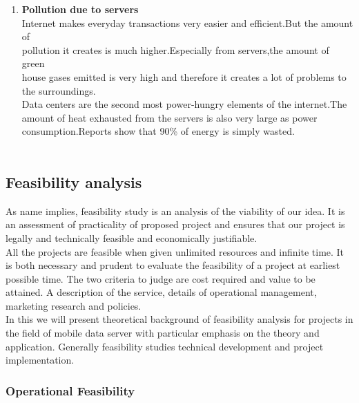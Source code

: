 \documentclass[12pt, a4paper]{article}
\begin{document}
\begin{enumerate}[leftmargin=1.2cm]
\item \textbf{Pollution due to servers}\\Internet makes everyday transactions very easier and efficient.But the amount of \\ pollution it creates is much higher.Especially from servers,the amount of  green\\house gases emitted is very high and therefore it creates a lot of problems to the surroundings.\\
\hspace{5mm}Data centers are the second most power-hungry elements of the internet.The amount of heat exhausted from the servers is also very large as power consumption.Reports show that 90\% of energy is simply wasted.\\\\
\end{enumerate}

\subsection{Feasibility analysis}
As name implies, feasibility study is an analysis of the viability of our idea. It is an assessment of practicality of proposed project and ensures that our project is legally and technically feasible and economically justifiable.
\\

\hspace{5mm}All the projects are feasible when given unlimited resources and infinite time. It is both necessary and prudent to evaluate the feasibility of a project at earliest possible time. The two criteria to judge are cost required and value to be attained. A description of the service, details of operational management, marketing research and policies.
\\

\hspace{5mm}In this we will present theoretical background of feasibility analysis for projects in the field of mobile data server with particular emphasis on the theory and application. Generally feasibility studies technical development and project implementation.\\
 
 \vspace{5mm}
\subsubsection{Operational Feasibility}
\end{document}
